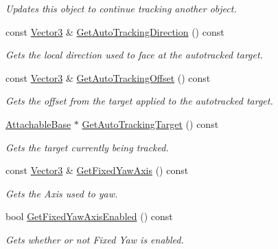 \begin{DoxyCompactItemize}
\begin{DoxyCompactList}\small\item\em Updates this object to continue tracking another object. \item\end{DoxyCompactList}\item 
const \hyperlink{classMezzanine_1_1Vector3}{Vector3} \& \hyperlink{classMezzanine_1_1WorldNode_a24bedb35bbddea779da919fcff7561ee}{GetAutoTrackingDirection} () const 
\begin{DoxyCompactList}\small\item\em Gets the local direction used to face at the autotracked target. \item\end{DoxyCompactList}\item 
const \hyperlink{classMezzanine_1_1Vector3}{Vector3} \& \hyperlink{classMezzanine_1_1WorldNode_a6143ff48ae180f5fdcd8903f2804f105}{GetAutoTrackingOffset} () const 
\begin{DoxyCompactList}\small\item\em Gets the offset from the target applied to the autotracked target. \item\end{DoxyCompactList}\item 
\hyperlink{classMezzanine_1_1AttachableBase}{AttachableBase} $\ast$ \hyperlink{classMezzanine_1_1WorldNode_a6768b6aa1ca9a4a427917b88d8a95295}{GetAutoTrackingTarget} () const 
\begin{DoxyCompactList}\small\item\em Gets the target currently being tracked. \item\end{DoxyCompactList}\item 
const \hyperlink{classMezzanine_1_1Vector3}{Vector3} \& \hyperlink{classMezzanine_1_1WorldNode_a27a9f2fb9a638cebb8ee8a328c1a4803}{GetFixedYawAxis} () const 
\begin{DoxyCompactList}\small\item\em Gets the Axis used to yaw. \item\end{DoxyCompactList}\item 
bool \hyperlink{classMezzanine_1_1WorldNode_ae4f695676c1c57c277595349cf4984d1}{GetFixedYawAxisEnabled} () const 
\begin{DoxyCompactList}\small\item\em Gets whether or not Fixed Yaw is enabled. \item\end{DoxyCompactList}\item 

\end{DoxyCompactItemize}
